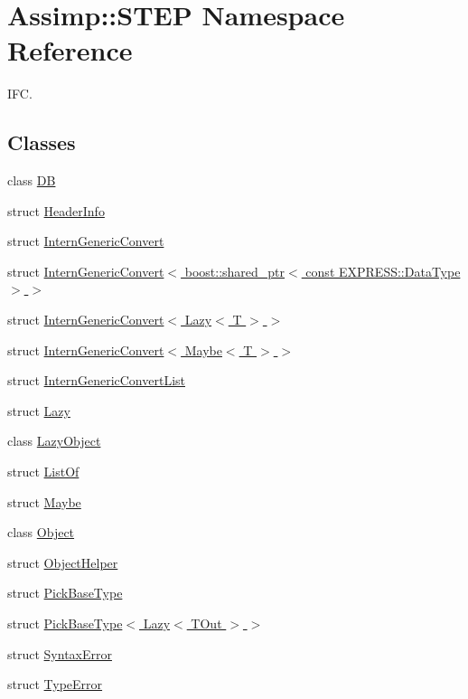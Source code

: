 \hypertarget{namespace_assimp_1_1_s_t_e_p}{\section{Assimp\+:\+:S\+T\+E\+P Namespace Reference}
\label{namespace_assimp_1_1_s_t_e_p}
}


I\+F\+C.  


\subsection*{Classes}
\begin{DoxyCompactItemize}
\item 
class \hyperlink{class_assimp_1_1_s_t_e_p_1_1_d_b}{D\+B}
\item 
struct \hyperlink{struct_assimp_1_1_s_t_e_p_1_1_header_info}{Header\+Info}
\item 
struct \hyperlink{struct_assimp_1_1_s_t_e_p_1_1_intern_generic_convert}{Intern\+Generic\+Convert}
\item 
struct \hyperlink{struct_assimp_1_1_s_t_e_p_1_1_intern_generic_convert_3_01boost_1_1shared__ptr_3_01const_01_e_x_pa45d610def03ce946d5cb75b5f6cce04}{Intern\+Generic\+Convert$<$ boost\+::shared\+\_\+ptr$<$ const E\+X\+P\+R\+E\+S\+S\+::\+Data\+Type $>$ $>$}
\item 
struct \hyperlink{struct_assimp_1_1_s_t_e_p_1_1_intern_generic_convert_3_01_lazy_3_01_t_01_4_01_4}{Intern\+Generic\+Convert$<$ Lazy$<$ T $>$ $>$}
\item 
struct \hyperlink{struct_assimp_1_1_s_t_e_p_1_1_intern_generic_convert_3_01_maybe_3_01_t_01_4_01_4}{Intern\+Generic\+Convert$<$ Maybe$<$ T $>$ $>$}
\item 
struct \hyperlink{struct_assimp_1_1_s_t_e_p_1_1_intern_generic_convert_list}{Intern\+Generic\+Convert\+List}
\item 
struct \hyperlink{struct_assimp_1_1_s_t_e_p_1_1_lazy}{Lazy}
\item 
class \hyperlink{class_assimp_1_1_s_t_e_p_1_1_lazy_object}{Lazy\+Object}
\item 
struct \hyperlink{struct_assimp_1_1_s_t_e_p_1_1_list_of}{List\+Of}
\item 
struct \hyperlink{struct_assimp_1_1_s_t_e_p_1_1_maybe}{Maybe}
\item 
class \hyperlink{class_assimp_1_1_s_t_e_p_1_1_object}{Object}
\item 
struct \hyperlink{struct_assimp_1_1_s_t_e_p_1_1_object_helper}{Object\+Helper}
\item 
struct \hyperlink{struct_assimp_1_1_s_t_e_p_1_1_pick_base_type}{Pick\+Base\+Type}
\item 
struct \hyperlink{struct_assimp_1_1_s_t_e_p_1_1_pick_base_type_3_01_lazy_3_01_t_out_01_4_01_4}{Pick\+Base\+Type$<$ Lazy$<$ T\+Out $>$ $>$}
\item 
struct \hyperlink{struct_assimp_1_1_s_t_e_p_1_1_syntax_error}{Syntax\+Error}
\item 
struct \hyperlink{struct_assimp_1_1_s_t_e_p_1_1_type_error}{Type\+Error}
\end{DoxyCompactItemize}

